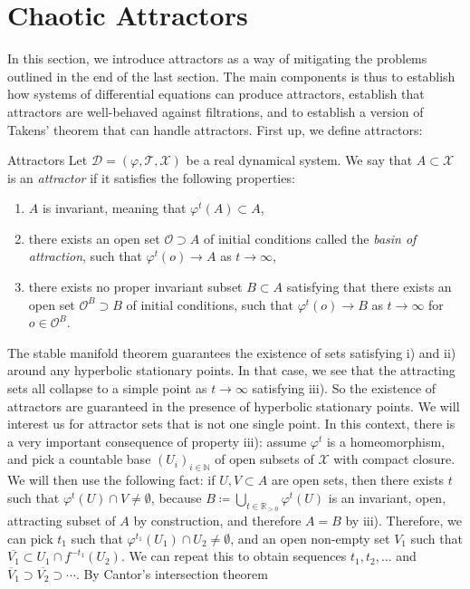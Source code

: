 \documentclass[11pt, a4paper]{memoir}
\theoremstyle{break}
\theoremstyle{break}
\theoremstyle{nonumberplain}
\newcommand{\mN}{\mathbb{N}}
\newcommand{\mR}{\mathbb{R}}
\begin{document}
\section{Chaotic Attractors}
In this section, we introduce attractors as a way of mitigating the problems outlined in the end of the last section. The main components is thus to establish how systems of differential equations can produce attractors, establish that attractors are well-behaved against filtrations, and to establish a version of Takens' theorem that can handle attractors. First up, we define attractors:
\begin{mydefinition}{Attractors}
Let $\mathcal{D}=(\varphi,\mathcal{T},\mathcal{X})$ be a real dynamical system. We say that $A\subset \mathcal{X}$ is an \emph{attractor} if it satisfies the following properties:
\begin{enumerate}[label=\roman*)]
	\item $A$ is invariant, meaning that $\varphi^t(A)\subset A$,
	\item there exists an open set $\mathcal{O}\supset A$ of initial conditions called the \emph{basin of attraction}, such that $\varphi^t(o)\to A$ as $t\to \infty$,
	\item there exists no proper invariant subset $B\subset A$ satisfying that there exists an open set $\mathcal{O}^B\supset B$ of initial conditions, such that $\varphi^t(o)\to B$ as $t\to \infty$ for $o\in \mathcal{O}^B$.
\end{enumerate}
\end{mydefinition}
The stable manifold theorem guarantees the existence of sets satisfying i) and ii) around any hyperbolic stationary points. In that case, we see that the attracting sets all collapse to a simple point as $t\to\infty$ satisfying iii). So the existence of attractors are guaranteed in the presence of hyperbolic stationary points. We will interest us for attractor sets that is not one single point. In this context, there is a very important consequence of property iii): assume $\varphi^t$ is a homeomorphism, and pick a countable base $(U_i)_{i\in \mN}$ of open subsets of $\mathcal{X}$ with compact closure. We will then use the following fact: if $U,V\subset A$ are open sets, then there exists $t$ such that $\varphi^{t}(U)\cap V\neq \emptyset$, because $B\coloneqq \bigcup_{t\in \mR_{>0}}\varphi^{t}(U)$ is an invariant, open, attracting subset of $A$ by construction, and therefore $A=B$ by iii). Therefore, we can pick $t_1$ such that $\varphi^{t_1}(U_1)\cap U_2\neq\emptyset$, and an open non-empty set $V_1$ such that $\overline{V_1}\subset U_1\cap f^{-t_1}(U_2)$. We can repeat this to obtain sequences $t_1,t_2,\ldots$ and $\overline{V}_1\supset \overline{V_2}\supset\cdots$. By Cantor's intersection theorem
\end{document}
